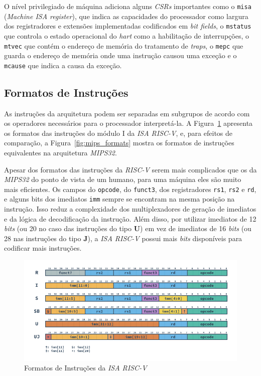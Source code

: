    { O nível privilegiado de máquina adiciona alguns \textit{CSRs} importantes
        como o \texttt{misa} (\textit{Machine ISA register}), que indica as
        capacidades do processador como largura dos registradores e extensões
        implementadas codificados em \textit{bit fields}, o \texttt{mstatus}
        que controla o estado operacional do \textit{hart} como a habilitação
        de interrupções, o \texttt{mtvec} que contém o endereço de memória
        do tratamento de \textit{traps}, o \texttt{mepc} que guarda o endereço
        de memória onde uma instrução causou uma exceção e o \texttt{mcause}
        que indica a causa da exceção.
    }

    \subsection{Formatos de Instruções}
    { As instruções da arquitetura podem ser separadas em subgrupos de acordo com
        os operadores necessários para o processador interpretá-la. A
        Figura~\ref{fig:riscv_formats} apresenta os formatos das instruções do
        módulo I da \textit{ISA RISC-V}, e, para efeitos de comparação, a
        Figura~\ref{fig:mips_formats} mostra os formatos de instruções equivalentes
        na arquitetura \textit{MIPS32}.
    }

    { Apesar dos formatos das instruções da \textit{RISC-V} serem mais
        complicados que os da \textit{MIPS32} do ponto de vista de um
        humano, para uma máquina eles são muito mais eficientes. Os campos
        do \texttt{opcode}, do \texttt{funct3}, dos registradores \texttt{rs1},
        \texttt{rs2} e \texttt{rd}, e alguns bits dos imediatos \texttt{imm}
        sempre se encontram na mesma posição na instrução. Isso reduz a
        complexidade dos multiplexadores de geração de imediatos e da lógica
        de decodificação da instrução. Além disso, por utilizar imediatos de
        12 \textit{bits} (ou 20 no caso das instruções do tipo \textbf{U})
        em vez de imediatos de 16 \textit{bits} (ou 28 nas instruções do
        tipo \textbf{J}), a \textit{ISA RISC-V} possui mais \textit{bits}
        disponíveis para codificar mais instruções.
    }

    \begin{figure}[H]
    \centering
        \includegraphics[width=.9\linewidth]{../images/RV_Formats.png}
        \caption{Formatos de Instruções da \textit{ISA RISC-V}}\label{fig:riscv_formats}
    \end{figure}

